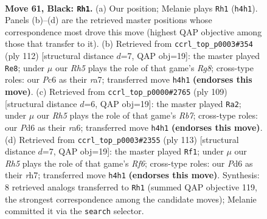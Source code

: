 \documentclass[11pt]{article}
\begin{document}
\clearpage

\begin{figure}[p]\centering
\begin{subfigure}{0.46\textwidth}\centering
\resizebox{\linewidth}{!}{%
\newchessgame
\chessboard[
  setfen={8/8/2pp4/p4k2/7r/6K1/8/8 b - - 1 61},
  showmover=false,
  pgfstyle=straightmove, color=movearrow, markmove={h4-h1}
]}
\caption{}
\end{subfigure}\hfill
\begin{subfigure}{0.46\textwidth}\centering
\resizebox{\linewidth}{!}{%
\newchessgame
\chessboard[
  setfen={6R1/r6k/5K2/8/5P2/7P/8/8 w - - 3 57},
  showmover=false,
  pgfstyle=straightmove, color=movearrow, markmove={g8-e8}
]}
\caption{}
\end{subfigure}
\\[4pt]
\begin{subfigure}{0.46\textwidth}\centering
\resizebox{\linewidth}{!}{%
\newchessgame
\chessboard[
  setfen={2k5/8/R7/4p3/p7/2K5/1r6/8 b - - 1 55},
  showmover=false,
  pgfstyle=straightmove, color=movearrow, markmove={b2-a2}
]}
\caption{}
\end{subfigure}\hfill
\begin{subfigure}{0.46\textwidth}\centering
\resizebox{\linewidth}{!}{%
\newchessgame
\chessboard[
  setfen={3k4/7R/8/4P3/p5K1/5r2/8/8 b - - 2 57},
  showmover=false,
  pgfstyle=straightmove, color=movearrow, markmove={f3-f1}
]}
\caption{}
\end{subfigure}
\caption{\textbf{Move 61, Black: \texttt{Rh1}.} (a) Our position; Melanie plays \texttt{Rh1} (\texttt{h4h1}). Panels (b)--(d) are the retrieved master positions whose correspondence most drove this move (highest QAP objective among those that transfer to it). (b) Retrieved from \texttt{ccrl\_top\_p0003\#354} (ply 112) [structural distance $d$=7, QAP obj=19]: the master played \texttt{Re8}; under $\mu$ our \emph{Rh5} plays the role of that game's \emph{Rg8}; cross-type roles: our \emph{P}c6 as their \emph{r}a7; transferred move \texttt{h4h1} \textbf{(endorses this move)}. (c) Retrieved from \texttt{ccrl\_top\_p0000\#2765} (ply 109) [structural distance $d$=6, QAP obj=19]: the master played \texttt{Ra2}; under $\mu$ our \emph{Rh5} plays the role of that game's \emph{Rb7}; cross-type roles: our \emph{P}d6 as their \emph{r}a6; transferred move \texttt{h4h1} \textbf{(endorses this move)}. (d) Retrieved from \texttt{ccrl\_top\_p0003\#2355} (ply 113) [structural distance $d$=7, QAP obj=19]: the master played \texttt{Rf1}; under $\mu$ our \emph{Rh5} plays the role of that game's \emph{Rf6}; cross-type roles: our \emph{P}d6 as their \emph{r}h7; transferred move \texttt{h4h1} \textbf{(endorses this move)}. Synthesis: 8 retrieved analogs transferred to \texttt{Rh1} (summed QAP objective 119, the strongest correspondence among the candidate moves); Melanie committed it via the \texttt{search} selector.}
\label{fig:thought-m121}
\end{figure}
\end{document}
